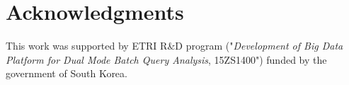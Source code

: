 \documentclass[conference]{IEEEtran}
\begin{document}

\section*{Acknowledgments}
This work was supported by ETRI R\&D program ("\textit{Development of Big Data Platform for Dual Mode Batch Query Analysis}, 15ZS1400")
funded by the government of South Korea.

%

\end{document}
